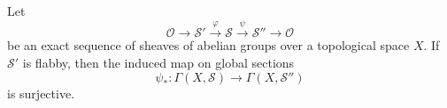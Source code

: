Let
$$\mathcal{O} \rightarrow \mathcal{S}' \xrightarrow{\varphi} \mathcal{S} \xrightarrow{\psi} \mathcal{S}'' \rightarrow \mathcal{O}$$
be an exact sequence of sheaves of abelian groups over a topological space $X$. If $\mathcal{S}'$ is flabby, then the induced map on global sections
$$\psi_* : \Gamma(X, \mathcal{S}) \rightarrow \Gamma(X, \mathcal{S}'')$$
is surjective.
